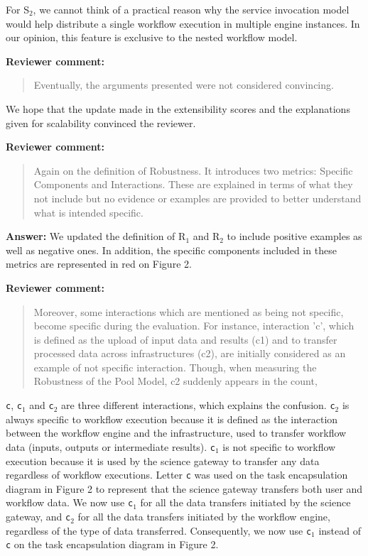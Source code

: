 \documentclass[a4]{letter}
\newenvironment{review}%
{\textbf{Reviewer comment:}\begin{quote}}%
{\end{quote}}%
\newcommand{\answer}[1]{\textbf{Answer:} #1}
\begin{document}
\begin{letter}{}
{  For S$_2$, we cannot think of a practical reason why the service
  invocation model would help distribute a single workflow execution
  in multiple engine instances. In our opinion, this feature is
  exclusive to the nested workflow model. }

\begin{review}
 Eventually, the arguments presented were not considered convincing.
\end{review}

We hope that the update made in the extensibility scores and the
explanations given for scalability convinced the reviewer.

\begin{review}
  Again on the definition of Robustness. It introduces two metrics:
  Specific Components and Interactions. These are explained in terms
  of what they not include but no evidence or examples are provided to
  better understand what is intended specific. 
\end{review}

\answer{We updated the definition of R$_1$ and R$_2$ to include
  positive examples as well as negative ones. In addition, the
  specific components included in these metrics are represented in red
  on Figure 2.}

\begin{review}
Moreover, some
  interactions which are mentioned as being not specific, become
  specific during the evaluation. For instance, interaction 'c', which
  is defined as the upload of input data and results (c1) and to
  transfer processed data across infrastructures (c2), are initially
  considered as an example of not specific interaction. Though, when
  measuring the Robustness of the Pool Model, c2 suddenly appears in
  the count, 
\end{review}

\texttt{c}, \texttt{c$_1$} and \texttt{c$_2$} are three different
interactions, which explains the confusion. \texttt{c$_2$} is always
specific to workflow execution because it is defined as the
interaction between the workflow engine and the infrastructure, used
to transfer workflow data (inputs, outputs or intermediate
results). \texttt{c$_1$} is not specific to workflow execution because
it is used by the science gateway to transfer any data regardless of
workflow executions. Letter \texttt{c} was used on the task
encapsulation diagram in Figure 2 to represent that the science gateway transfers
both user and workflow data. We now use \texttt{c$_1$} for all the
data transfers initiated by the science gateway, and \texttt{c$_2$}
for all the data transfers initiated by the workflow engine,
regardless of the type of data transferred. Consequently, we now use
\texttt{c$_1$} instead of \texttt{c} on the task encapsulation diagram in Figure 2.


\end{letter}
\end{document}
